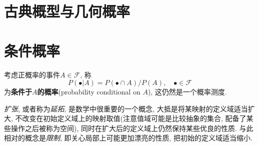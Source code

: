 \section{古典概型与几何概率}

\section{条件概率}

考虑正概率的事件$A \in \mathscr{F}$, 称
\[ P(\bullet|A) = P(\bullet\cap{A})/P(A), \quad \bullet \in \mathscr{F} \]
为\textbf{条件于$A$的概率}(probability conditional on $A$), 这仍然是一个概率测度.





\emph{扩张}, 或者称为\emph{延拓}, 是数学中很重要的一个概念, 大抵是将某映射的定义域适当扩大, 不改变在初始定义域上的映射取值(注意值域可能是比较抽象的集合, 配备了某些操作之后被称为空间), 同时在扩大后的定义域上仍然保持某些优良的性质. 与此相对的概念是\emph{限制}, 即关心局部上可能更加漂亮的性质, 把初始的定义域适当缩小.

